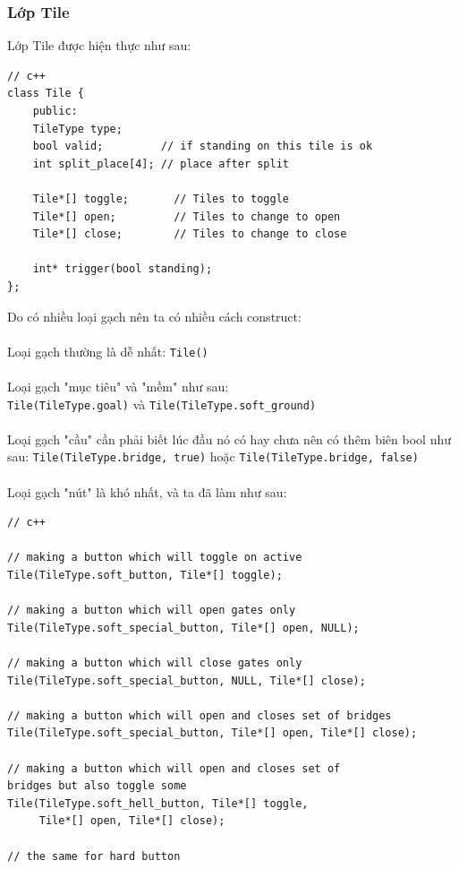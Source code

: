 \documentclass[a4paper, 11pt]{article}
\begin{document}
\subsubsection{Lớp Tile}
Lớp Tile được hiện thực như sau:
\begin{lstlisting}
// c++
class Tile {
    public:
    TileType type;
    bool valid;         // if standing on this tile is ok
    int split_place[4]; // place after split
    
    Tile*[] toggle;       // Tiles to toggle
    Tile*[] open;         // Tiles to change to open
    Tile*[] close;        // Tiles to change to close
    
    int* trigger(bool standing);
};
\end{lstlisting}
Do có nhiều loại gạch nên ta có nhiều cách construct:\\~\\
Loại gạch thường là dễ nhất: \texttt{Tile()}\\~\\
Loại gạch "mục tiêu" và "mềm" như sau: \\\texttt{Tile(TileType.goal)} và
\texttt{Tile(TileType.soft\_ground)}\\~\\
Loại gạch "cầu" cần phải biết lúc đầu nó có hay chưa nên có thêm biên bool như sau:
\texttt{Tile(TileType.bridge, true)} hoặc \texttt{Tile(TileType.bridge, false)}\\~\\
Loại gạch "nút" là khó nhất, và ta đã làm như sau:
\begin{lstlisting}
// c++

// making a button which will toggle on active
Tile(TileType.soft_button, Tile*[] toggle);
    
// making a button which will open gates only
Tile(TileType.soft_special_button, Tile*[] open, NULL);
    
// making a button which will close gates only
Tile(TileType.soft_special_button, NULL, Tile*[] close);
    
// making a button which will open and closes set of bridges
Tile(TileType.soft_special_button, Tile*[] open, Tile*[] close);
    
// making a button which will open and closes set of 
bridges but also toggle some
Tile(TileType.soft_hell_button, Tile*[] toggle, 
     Tile*[] open, Tile*[] close);
    
// the same for hard button
\end{lstlisting}
\end{document}
